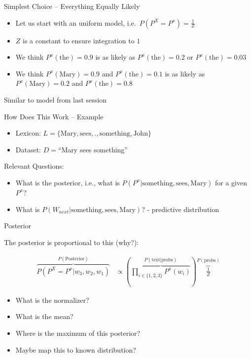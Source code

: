 \documentclass[11pt]{beamer}
\begin{document}
	\begin{frame}{Simplest Choice -- Everything Equally Likely}
		\begin{itemize}
			\item Let us start with an uniform model, i.e.\ $P\left( P^X = P^{x} \right) = \frac{1}{Z}$
			\item $Z$ is a constant to ensure integration to $1$
			\item We think $P^{x}(\text{the}) = 0.9$ is as likely as $P^{x}(\text{the}) = 0.2$ or $P^{x}(\text{the}) = 0.03$
			\item We think $P^{x}(\text{Mary}) = 0.9$ and $P^{x}(\text{the}) = 0.1$ is as likely as $P^{x}(\text{Mary}) = 0.2$ and $P^{x}(\text{the}) = 0.8$
		\end{itemize}
		
		\vspace{10pt}Similar to model from last session
	\end{frame}
	
	\begin{frame}{How Does This Work -- Example}
		\begin{itemize}
			\item<1-> Lexicon: $L = \lbrace \text{Mary}, \text{sees}, \text{.}, \text{something}, \text{John}  \rbrace$
			\item<1-> Dataset: $D=$``Mary sees something''
		\end{itemize}
		
		\vspace{10pt} Relevant Questions:
		
		\begin{itemize}
			\item<2-> What is the posterior, i.e., what is $P(P^x | \text{something},\text{sees},\text{Mary})$ for a given $P^x$?
			\item<3-> What is $P(W_{next} | \text{something},\text{sees},\text{Mary})$? - predictive distribution
		\end{itemize}
	\end{frame}
	
	\begin{frame}{Posterior}
	
		The posterior is proportional to this (why?):
	
		\begin{align*}
			\overbrace{P(P^X = P^x \vert w_3,w_2,w_1)}^{P(\text{Posterior})} & \propto \left(\overbrace{\prod_{i \in \{1,2,3\}} P^{x}(w_i)}^{P(\text{text}|\text{probs})}\right) \overbrace{\frac{1}{Z}}^{P(\text{probs})}
		\end{align*}
		
		\vspace{10pt}
		\begin{itemize}
			\item<2-> What is the normalizer?
			\item<2-> What is the mean?
			\item<2-> Where is the maximum of this posterior?
			\item<3-> Maybe map this to known distribution?
		\end{itemize}
	\end{frame}
	
\end{document}
